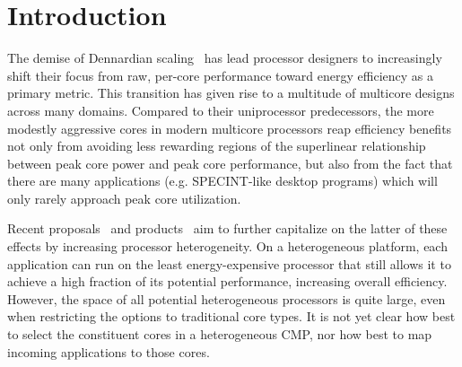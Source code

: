 \section{Introduction}
\label{sec:introduction}

The demise of Dennardian scaling~\cite{Dennard74-JSSC-MOSFET_Scaling}
has lead processor designers to increasingly shift their focus from
raw, per-core performance toward energy efficiency as a primary
metric. This transition has given rise to a multitude of multicore
designs across many domains. Compared to their uniprocessor
predecessors, the more modestly aggressive cores in modern multicore
processors reap efficiency benefits not only from avoiding less
rewarding regions of the superlinear relationship between peak core
power and peak core performance, but also from the fact that there are
many applications (e.g. SPECINT-like desktop programs) which will only
rarely approach peak core utilization.

Recent proposals~\cite{Lukefahr12-MICRO-CompositeCores,variable2011multi} and products~\cite{ARM11-WhitePaper-BigLittle} aim to
further capitalize on the latter of these effects by increasing
processor heterogeneity. On a heterogeneous platform, each application
can run on the least energy-expensive processor that still
allows it to achieve a high fraction of its potential performance,
increasing overall efficiency. However, the space of all potential
heterogeneous processors is quite large, even when restricting the
options to traditional core types. It is not yet clear how best to
select the constituent cores in a heterogeneous CMP, nor how best to
map incoming applications to those cores.

